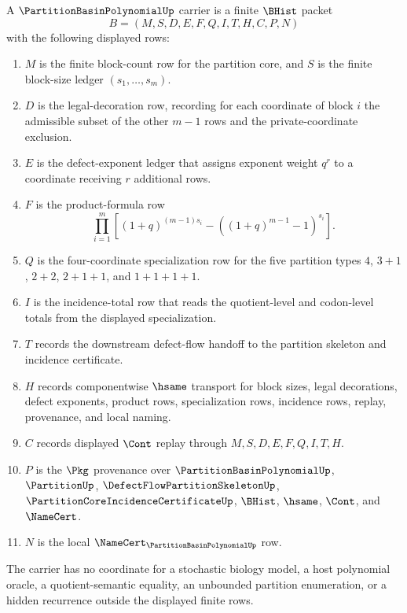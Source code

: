 \begin{definition}
\label{def:partition-basin-polynomial-carrier}
A $\PartitionBasinPolynomialUp$ carrier is a finite $\BHist$ packet
$$
B=(M,S,D,E,F,Q,I,T,H,C,P,N)
$$
with the following displayed rows:
\begin{enumerate}
\item $M$ is the finite block-count row for the partition core, and $S$ is the finite block-size ledger $(s_{1},\ldots,s_{m})$.
\item $D$ is the legal-decoration row, recording for each coordinate of block $i$ the admissible subset of the other $m-1$ rows and the private-coordinate exclusion.
\item $E$ is the defect-exponent ledger that assigns exponent weight $q^{r}$ to a coordinate receiving $r$ additional rows.
\item $F$ is the product-formula row
$$
\prod_{i=1}^{m}
\left[
(1+q)^{(m-1)s_{i}}
-
\left((1+q)^{m-1}-1\right)^{s_{i}}
\right].
$$
\item $Q$ is the four-coordinate specialization row for the five partition types $4$, $3+1$, $2+2$, $2+1+1$, and $1+1+1+1$.
\item $I$ is the incidence-total row that reads the quotient-level and codon-level totals from the displayed specialization.
\item $T$ records the downstream defect-flow handoff to the partition skeleton and incidence certificate.
\item $H$ records componentwise $\hsame$ transport for block sizes, legal decorations, defect exponents, product rows, specialization rows, incidence rows, replay, provenance, and local naming.
\item $C$ records displayed $\Cont$ replay through $M,S,D,E,F,Q,I,T,H$.
\item $P$ is the $\Pkg$ provenance over $\PartitionBasinPolynomialUp$, $\PartitionUp$, $\DefectFlowPartitionSkeletonUp$, $\PartitionCoreIncidenceCertificateUp$, $\BHist$, $\hsame$, $\Cont$, and $\NameCert$.
\item $N$ is the local $\NameCert_{\PartitionBasinPolynomialUp}$ row.
\end{enumerate}
The carrier has no coordinate for a stochastic biology model, a host polynomial oracle, a quotient-semantic equality, an unbounded partition enumeration, or a hidden recurrence outside the displayed finite rows.
\end{definition}

